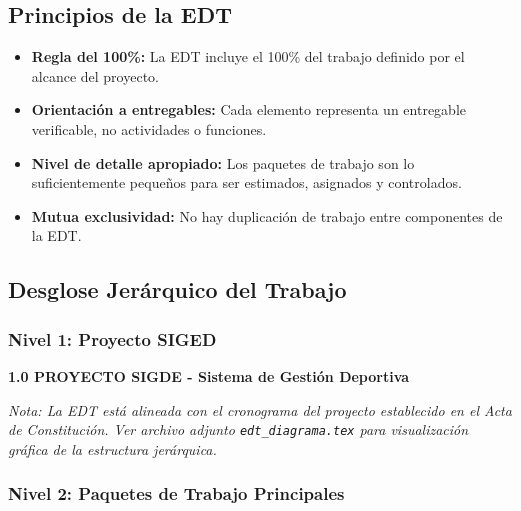 \documentclass[12pt,a4paper]{article}
\begin{document}
\subsection{Principios de la EDT}

\begin{itemize}[noitemsep]
    \item \textbf{Regla del 100\%:} La EDT incluye el 100\% del trabajo definido por el alcance del proyecto.
    \item \textbf{Orientación a entregables:} Cada elemento representa un entregable verificable, no actividades o funciones.
    \item \textbf{Nivel de detalle apropiado:} Los paquetes de trabajo son lo suficientemente pequeños para ser estimados, asignados y controlados.
    \item \textbf{Mutua exclusividad:} No hay duplicación de trabajo entre componentes de la EDT.
\end{itemize}

\subsection{Desglose Jerárquico del Trabajo}

\subsubsection{Nivel 1: Proyecto SIGED}

\textbf{1.0 PROYECTO SIGDE - Sistema de Gestión Deportiva}

\textit{Nota: La EDT está alineada con el cronograma del proyecto establecido en el Acta de Constitución. Ver archivo adjunto \texttt{edt\_diagrama.tex} para visualización gráfica de la estructura jerárquica.}

\subsubsection{Nivel 2: Paquetes de Trabajo Principales}
\end{document}
